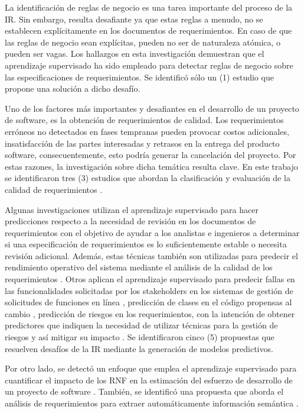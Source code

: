 \documentclass[journal]{IEEEtran}
\begin{document}
La identificación de reglas de negocio es una tarea importante del proceso de la IR. Sin embargo, resulta desafiante ya que estas reglas a menudo, no se establecen explícitamente en los documentos de requerimientos. En caso de que las reglas de negocio sean explícitas, pueden no ser de naturaleza atómica, o pueden ser vagas. Los hallazgos en esta investigación demuestran que el aprendizaje supervisado ha sido empleado para detectar reglas de negocio sobre las especificaciones de requerimientos\cite{sharma2014automated}. Se identificó sólo un (1) estudio que propone una solución a dicho desafío.

Uno de los factores más importantes y desafiantes en el desarrollo de un proyecto de software, es la obtención de requerimientos de calidad. Los requerimientos erróneos no detectados en fases tempranas pueden provocar costos adicionales, insatisfacción de las partes interesadas y retrasos en la entrega del producto software, consecuentemente, esto podría generar la cancelación del proyecto. Por estas razones, la investigación sobre dicha temática resulta clave. En este trabajo se identificaron tres (3) estudios que abordan la clasificación y evaluación de la calidad de requerimientos \cite{Parra2015180,Hayes2015,Hussain2007}. 

Algunas investigaciones utilizan el aprendizaje supervisado para hacer predicciones respecto a la necesidad de revisión en los documentos de requerimientos \cite{del2017stability} con el objetivo de ayudar a los analistas e ingenieros a determinar si una especificación de requerimientos es lo suficientemente estable o necesita revisión adicional. Además, estas técnicas también son utilizadas para predecir el rendimiento operativo del sistema mediante el análisis de la calidad de los requerimientos \cite{dargan2016systems}. Otros aplican el aprendizaje supervisado para predecir fallas en las funcionalidades solicitadas por los stakeholders en los sistemas de gestión de solicitudes de funciones en línea \cite{fitzgerald2012early}, predicción de clases en el código propensas al cambio \cite{malhotra2017exploratory}, predicción de riesgos en los requerimientos, con la intención de obtener predictores que indiquen la necesidad de utilizar técnicas para la gestión de riesgos y así mitigar su impacto \cite{del2011requirement}. Se identificaron cinco (5) propuestas que resuelven desafíos de la IR mediante la generación de modelos predictivos. 

Por otro lado, se detectó un enfoque que emplea el aprendizaje supervisado para cuantificar el impacto de los RNF en la estimación del esfuerzo de desarrollo de un proyecto de software \cite{Abdukalykov2011158}. También, se identificó una propuesta que aborda el análisis de requerimientos para extraer automáticamente información semántica \cite{Wang2016}. 
\end{document}
